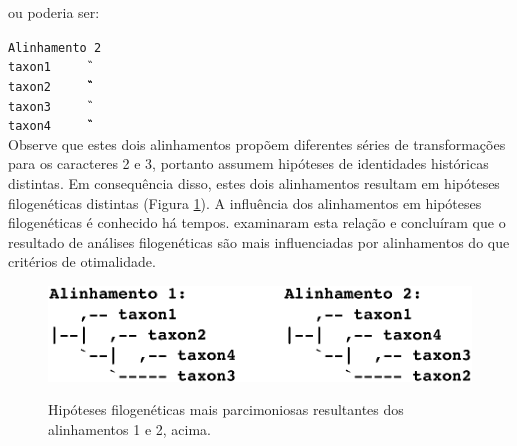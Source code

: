 \begin{refsection}
ou poderia ser:

\texttt{Alinhamento 2}\\
\indent\indent\indent\indent\indent\indent\indent\texttt{taxon1~~~~~\T\gap\T\G\gap\C\A}\\
\indent\indent\indent\indent\indent\indent\indent\texttt{taxon2~~~~~\T\G\G\G\C\C\A}\\
\indent\indent\indent\indent\indent\indent\indent\texttt{taxon3~~~~~\T\G\gap\gap\C\A\A}\\
\indent\indent\indent\indent\indent\indent\indent\texttt{taxon4~~~~~\T\gap\G\G\C\T\A}\\

Observe que estes dois alinhamentos propõem diferentes séries de transformações para os caracteres 2 e 3, portanto assumem hipóteses de identidades históricas \parencite[senso][]{Grant_and_Kluge_2004} distintas. Em consequência disso, estes dois alinhamentos resultam em hipóteses filogenéticas distintas (Figura \ref{tut8:fig:alinhamentos_examples}). A influência dos alinhamentos em hipóteses filogenéticas é conhecido há tempos. \textcite{Morrison_and_Ellis_1997} examinaram esta relação e concluíram que o resultado de análises filogenéticas são mais influenciadas por alinhamentos do que critérios de otimalidade.

  \begin{figure}[H]
       \centering
      {\includegraphics[scale=0.9]{figures/tut8/alinhamentos_examples.eps}}
	{\caption[Consequência de alinhamentos em topologias]{Hipóteses filogenéticas mais parcimoniosas resultantes dos alinhamentos 1 e 2, acima.}\label{tut8:fig:alinhamentos_examples}}
  \end{figure}



\end{refsection}
